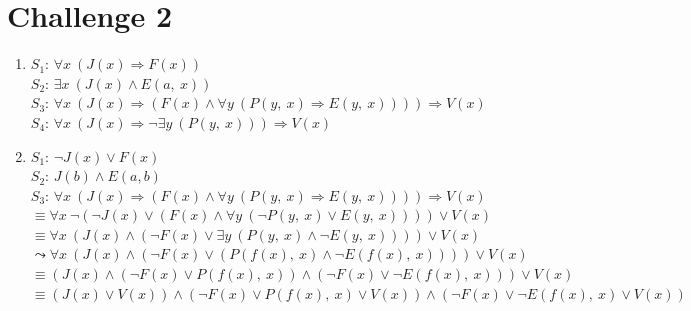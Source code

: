\documentclass{article}
\begin{document}
\section*{Challenge 2}
\begin{enumerate}
    \item 
    $S_1$: $\forall x\ (J(x) \Rightarrow F(x))$  \\
    $S_2$: $\exists x\ (J(x) \wedge E(a,\ x))$  \\
    $S_3$: $\forall x\ (J(x) \Rightarrow (F(x) \wedge \forall y\ (P(y,\ x) \Rightarrow E(y,\ x)))) \Rightarrow V(x)$  \\
    $S_4$: $\forall x\ (J(x) \Rightarrow \neg\exists y\ (P(y,\ x))) \Rightarrow V(x)$
    
    \item
    $S_1$: $\neg J(x) \vee F(x)$\\
    $S_2$: $J(b) \wedge E(a, b)$\\
    $S_3$: $\forall x\ (J(x) \Rightarrow (F(x) \wedge \forall y\ (P(y,\ x) \Rightarrow E(y,\ x)))) \Rightarrow V(x)$\\
    \hspace*{7.5pt}$\equiv \forall x\ \neg(\neg J(x) \vee (F(x) \wedge \forall y\ (\neg P(y,\ x) \vee E(y,\ x)))) \vee V(x)$\\
    \hspace*{7.5pt}$\equiv \forall x\ (J(x) \wedge (\neg F(x) \vee \exists y\ (P(y,\ x) \wedge \neg E(y,\ x) ))) \vee V(x)$\\
    \hspace*{7.5pt}$\leadsto \forall x\ (J(x) \wedge (\neg F(x) \vee (P(f(x),\ x) \wedge \neg E(f(x),\ x)))) \vee V(x)$\\
    \hspace*{7.5pt}$\equiv (J(x) \wedge (\neg F(x) \vee P(f(x),\ x)) \wedge (\neg F(x) \vee \neg E(f(x),\ x))) \vee V(x)$\\
    \hspace*{7.5pt}$\equiv (J(x) \vee V(x)) \wedge (\neg F(x) \vee P(f(x),\ x) \vee V(x)) \wedge (\neg F(x) \vee \neg E(f(x),\ x) \vee V(x))$
    

\end{enumerate}
\end{document}
